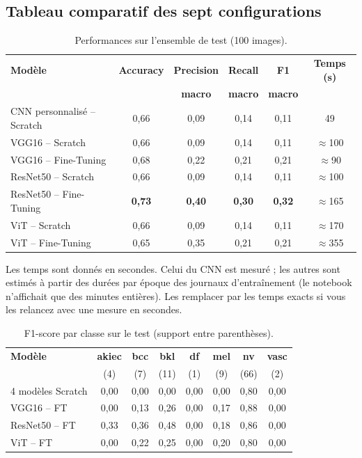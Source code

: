 \documentclass[12pt,a4paper]{article}
\begin{document}
\subsection{Tableau comparatif des sept configurations}
\begin{table}[H]
\centering
\caption{Performances sur l'ensemble de test (100 images).}\label{tab:comparatif}
\small
\begin{tabular}{lccccc}
\toprule
\textbf{Modèle} & \textbf{Accuracy} & \textbf{Precision} & \textbf{Recall} & \textbf{F1} & \textbf{Temps (s)} \\
 & & \textbf{macro} & \textbf{macro} & \textbf{macro} & \\
\midrule
CNN personnalisé -- Scratch & 0,66 & 0,09 & 0,14 & 0,11 & 49 \\
VGG16 -- Scratch & 0,66 & 0,09 & 0,14 & 0,11 & $\approx$100 \\
VGG16 -- Fine-Tuning & 0,68 & 0,22 & 0,21 & 0,21 & $\approx$90 \\
ResNet50 -- Scratch & 0,66 & 0,09 & 0,14 & 0,11 & $\approx$100 \\
ResNet50 -- Fine-Tuning & \textbf{0,73} & \textbf{0,40} & \textbf{0,30} & \textbf{0,32} & $\approx$165 \\
ViT -- Scratch & 0,66 & 0,09 & 0,14 & 0,11 & $\approx$170 \\
ViT -- Fine-Tuning & 0,65 & 0,35 & 0,21 & 0,21 & $\approx$355 \\
\bottomrule
\end{tabular}
\end{table}
\noindent\small Les temps sont donnés en secondes. Celui du CNN est mesuré ; les autres sont estimés à partir des durées par époque des journaux d'entraînement (le notebook n'affichait que des minutes entières). Les remplacer par les temps exacts si vous les relancez avec une mesure en secondes.\normalsize

\begin{table}[H]
\centering
\caption{F1-score par classe sur le test (support entre parenthèses).}\label{tab:f1classe}
\footnotesize\setlength{\tabcolsep}{3.5pt}
\begin{tabular}{lccccccc}
\toprule
\textbf{Modèle} & \textbf{akiec} & \textbf{bcc} & \textbf{bkl} & \textbf{df} & \textbf{mel} & \textbf{nv} & \textbf{vasc} \\
 & (4) & (7) & (11) & (1) & (9) & (66) & (2) \\
\midrule
4 modèles Scratch & 0,00 & 0,00 & 0,00 & 0,00 & 0,00 & 0,80 & 0,00 \\
VGG16 -- FT & 0,00 & 0,13 & 0,26 & 0,00 & 0,17 & 0,88 & 0,00 \\
ResNet50 -- FT & 0,33 & 0,36 & 0,48 & 0,00 & 0,18 & 0,86 & 0,00 \\
ViT -- FT & 0,00 & 0,22 & 0,25 & 0,00 & 0,20 & 0,80 & 0,00 \\
\bottomrule
\end{tabular}
\end{table}
\end{document}
